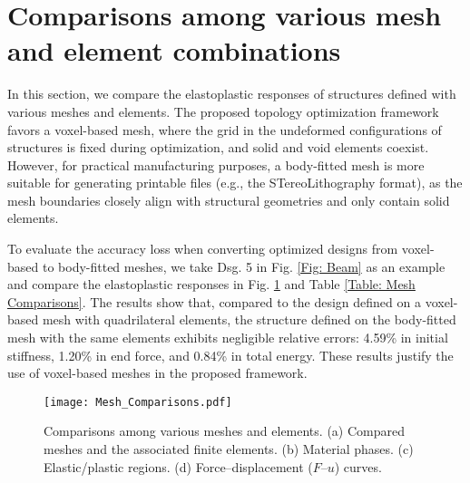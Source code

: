 \documentclass[preprint,11pt]{elsarticle}
\theoremstyle{definition}
\begin{document}
\section{Comparisons among various mesh and element combinations}
\label{Sec: Comparison of Meshes}

In this section, we compare the elastoplastic responses of structures defined with various meshes and elements. The proposed topology optimization framework favors a voxel-based mesh, where the grid in the undeformed configurations of structures is fixed during optimization, and solid and void elements coexist. However, for practical manufacturing purposes, a body-fitted mesh is more suitable for generating printable files (e.g., the STereoLithography format), as the mesh boundaries closely align with structural geometries and only contain solid elements.

To evaluate the accuracy loss when converting optimized designs from voxel-based to body-fitted meshes, we take Dsg. 5 in Fig. \ref{Fig: Beam} as an example and compare the elastoplastic responses in Fig. \ref{Fig: Mesh Comparisons} and Table \ref{Table: Mesh Comparisons}. The results show that, compared to the design defined on a voxel-based mesh with quadrilateral elements, the structure defined on the body-fitted mesh with the same elements exhibits negligible relative errors: 4.59\% in initial stiffness, 1.20\% in end force, and 0.84\% in total energy. These results justify the use of voxel-based meshes in the proposed framework.

\begin{figure}[!htbp]
    \centering
    \texttt{[image: Mesh\_Comparisons.pdf]}
    \caption{Comparisons among various meshes and elements. (a) Compared meshes and the associated finite elements. (b) Material phases. (c) Elastic/plastic regions. (d) Force--displacement ($F$--$u$) curves.}
    \label{Fig: Mesh Comparisons}
\end{figure}
\end{document}
